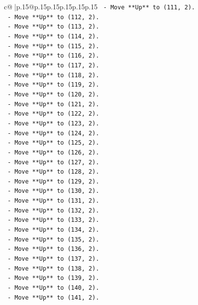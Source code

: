 \documentclass{article}
\begin{document}
{\begin{supertabular}{c@{$\;$}|p{.15\linewidth}@{}p{.15\linewidth}p{.15\linewidth}p{.15\linewidth}p{.15\linewidth}p{.15\linewidth}}
{{{\texttt{    {-} Move **Up** to (111, 2).} \\
\texttt{    {-} Move **Up** to (112, 2).} \\
\texttt{    {-} Move **Up** to (113, 2).} \\
\texttt{    {-} Move **Up** to (114, 2).} \\
\texttt{    {-} Move **Up** to (115, 2).} \\
\texttt{    {-} Move **Up** to (116, 2).} \\
\texttt{    {-} Move **Up** to (117, 2).} \\
\texttt{    {-} Move **Up** to (118, 2).} \\
\texttt{    {-} Move **Up** to (119, 2).} \\
\texttt{    {-} Move **Up** to (120, 2).} \\
\texttt{    {-} Move **Up** to (121, 2).} \\
\texttt{    {-} Move **Up** to (122, 2).} \\
\texttt{    {-} Move **Up** to (123, 2).} \\
\texttt{    {-} Move **Up** to (124, 2).} \\
\texttt{    {-} Move **Up** to (125, 2).} \\
\texttt{    {-} Move **Up** to (126, 2).} \\
\texttt{    {-} Move **Up** to (127, 2).} \\
\texttt{    {-} Move **Up** to (128, 2).} \\
\texttt{    {-} Move **Up** to (129, 2).} \\
\texttt{    {-} Move **Up** to (130, 2).} \\
\texttt{    {-} Move **Up** to (131, 2).} \\
\texttt{    {-} Move **Up** to (132, 2).} \\
\texttt{    {-} Move **Up** to (133, 2).} \\
\texttt{    {-} Move **Up** to (134, 2).} \\
\texttt{    {-} Move **Up** to (135, 2).} \\
\texttt{    {-} Move **Up** to (136, 2).} \\
\texttt{    {-} Move **Up** to (137, 2).} \\
\texttt{    {-} Move **Up** to (138, 2).} \\
\texttt{    {-} Move **Up** to (139, 2).} \\
\texttt{    {-} Move **Up** to (140, 2).} \\
\texttt{    {-} Move **Up** to (141, 2).} \\
}}}
\end{supertabular}}
\end{document}
